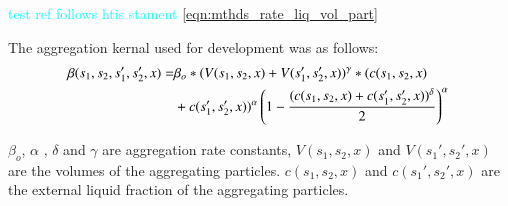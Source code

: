 \textcolor{cyan}{test ref follows htis stament} \ref{eqn:mthds_rate_liq_vol_part}

The aggregation kernal used for development was as follows:
\begin{align}
\beta(s_1,s_2,s_1',s_2',x) = & \beta_o*(V(s_1,s_2,x)+V(s_1',s_2',x))^{\gamma}*(c(s_1,s_2,x)\notag\\
&+c(s_1',s_2',x))^{\alpha}\left(1-\frac{(c(s_1,s_2,x)+c(s_1',s_2',x))^{\delta}}{2}\right)^{\alpha}\
\label{eqn:mthds_sa_pbm_beta_kernal} 
\end{align}

$\beta_o$,  $\alpha$ , $\delta$ and $\gamma$ are aggregation rate constants, $V(s_1,s_2, x)$ and $V(s_1',s_2',x)$ are the volumes of the aggregating particles. $c(s_1,s_2, x)$ and $c(s_1',s_2',x)$ are the external liquid fraction of the aggregating particles.







